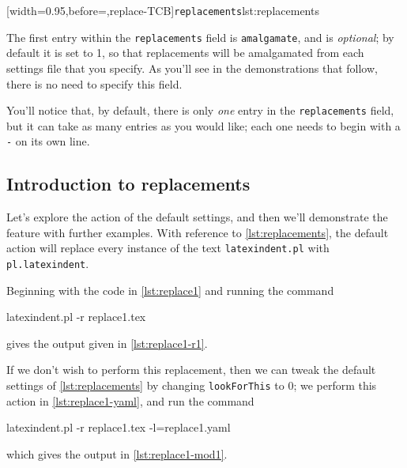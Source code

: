  [width=0.95\linewidth,before=\centering,replace-TCB]{\texttt{replacements}}{lst:replacements}

 The first entry within the \texttt{replacements} field is \texttt{amalgamate}, and is
 \emph{optional}; by default it is set to 1, so that replacements will be amalgamated from
 each settings file that you specify. As you'll see in the demonstrations that follow,
 there is no need to specify this field.

 You'll notice that, by default, there is only \emph{one} entry in the
 \texttt{replacements} field, but it can take as many entries as you would like; each one
 needs to begin with a \texttt{-} on its own line.

\subsection{Introduction to replacements}
	Let's explore the action of the default settings, and then we'll demonstrate the feature
	with further examples. With reference to \cref{lst:replacements}, the default action will
	replace every instance of the text \texttt{latexindent.pl} with \texttt{pl.latexindent}.

	Beginning with the code in \cref{lst:replace1} and running the command 
	\begin{commandshell}
latexindent.pl -r replace1.tex
\end{commandshell}
	gives the output given in \cref{lst:replace1-r1}.

	\begin{cmhtcbraster}[raster column skip=.01\linewidth]
	\end{cmhtcbraster}

	If we don't wish to perform this replacement, then we can tweak the default settings of
	\vref{lst:replacements} by changing \texttt{lookForThis} to 0; we perform this action in
	\cref{lst:replace1-yaml}, and run the command 
	\begin{commandshell}
latexindent.pl -r replace1.tex -l=replace1.yaml
\end{commandshell}
	which gives the output in \cref{lst:replace1-mod1}.

